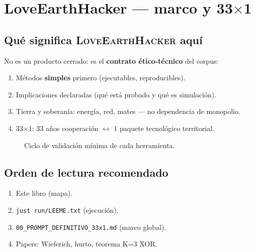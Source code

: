 \documentclass[11pt,a4paper,twoside]{book}
\newcommand{\LoveEarthHacker}{\textsc{LoveEarthHacker}}
\begin{document}
\chapter{LoveEarthHacker — marco y 33\texorpdfstring{$\times$}{x}1}

\section{Qué significa \LoveEarthHacker{} aquí}
No es un producto cerrado: es el \textbf{contrato ético-técnico} del corpus:
\begin{enumerate}[noitemsep]
  \item Métodos \textbf{simples} primero (ejecutables, reproducibles).
  \item Implicaciones declaradas (qué está probado y qué es simulación).
  \item Tierra y soberanía: energía, red, mates --- no dependencia de monopolio.
  \item 33$\times$1: 33 años cooperación $\leftrightarrow$ 1 paquete tecnológico territorial.
\end{enumerate}

\begin{figure}[htbp]
\centering
{}
\caption{Ciclo de validación mínima de cada herramienta.}
\end{figure}

\section{Orden de lectura recomendado}
\begin{enumerate}
  \item Este libro (mapa).
  \item \texttt{just run/LEEME.txt} (ejecución).
  \item \texttt{00\_PROMPT\_DEFINITIVO\_33x1.md} (marco global).
  \item Papers: Wieferich, hurto, teorema K=3 XOR.
\end{enumerate}
\end{document}
